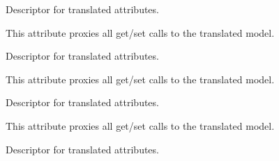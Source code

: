 \documentclass[letterpaper,10pt,english]{sphinxmanual}
\begin{document}
\begin{fulllineitems}
\begin{fulllineitems}
\end{fulllineitems}


\begin{fulllineitems}
\label{\detokenize{index:core.models.FoodInfo.bar_hours_end}}
\pysigstartsignatures
\pysigline
{}
\pysigstopsignatures
\sphinxAtStartPar
Descriptor for translated attributes.

\sphinxAtStartPar
This attribute proxies all get/set calls to the translated model.

\end{fulllineitems}


\begin{fulllineitems}
\label{\detokenize{index:core.models.FoodInfo.bar_hours_start}}
\pysigstartsignatures
\pysigline
{}
\pysigstopsignatures
\sphinxAtStartPar
Descriptor for translated attributes.

\sphinxAtStartPar
This attribute proxies all get/set calls to the translated model.

\end{fulllineitems}


\begin{fulllineitems}
\label{\detokenize{index:core.models.FoodInfo.bread_hours_end}}
\pysigstartsignatures
\pysigline
{}
\pysigstopsignatures
\sphinxAtStartPar
Descriptor for translated attributes.

\sphinxAtStartPar
This attribute proxies all get/set calls to the translated model.

\end{fulllineitems}


\begin{fulllineitems}
\label{\detokenize{index:core.models.FoodInfo.bread_hours_reservations}}
\pysigstartsignatures
\pysigline
{}
\pysigstopsignatures
\sphinxAtStartPar
Descriptor for translated attributes.


\end{fulllineitems}
\end{fulllineitems}
\end{document}
